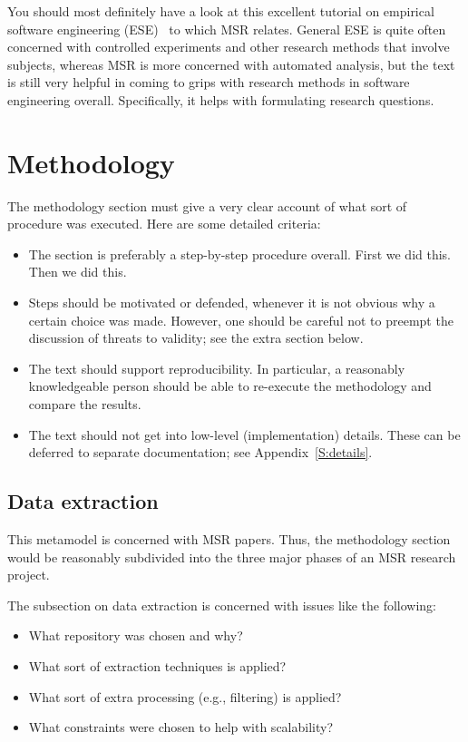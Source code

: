 \documentclass{llncs}
\begin{document}
You should most definitely have a look at this excellent tutorial on
empirical software engineering (ESE)~\cite{Easterbrook07} to which MSR
relates. General ESE is quite often concerned with controlled
experiments and other research methods that involve subjects, whereas
MSR is more concerned with automated analysis, but the text is still
very helpful in coming to grips with research methods in software
engineering overall. Specifically, it helps with formulating research questions.


\section{Methodology}

The methodology section must give a very clear account of what sort of
procedure was executed. Here are some detailed criteria:
%
\begin{itemize}
\item The section is preferably a step-by-step procedure overall. First we did
  this. Then we did this.
\item Steps should be motivated or defended, whenever it is not
  obvious why a certain choice was made. However, one should be
  careful not to preempt the discussion of threats to validity; see
  the extra section below.
\item The text should support reproducibility. In particular, a
  reasonably knowledgeable person should be able to re-execute the
  methodology and compare the results.
\item The text should not get into low-level (implementation)
  details. These can be deferred to separate documentation; see Appendix~\ref{S:details}.
\end{itemize}

\subsection{Data extraction}

This metamodel is concerned with MSR papers. Thus, the methodology
section would be reasonably subdivided into the three major phases of
an MSR research project.

The subsection on data extraction is concerned with issues like the
following:

\begin{itemize}
\item What repository was chosen and why?
\item What sort of extraction techniques is applied?
\item What sort of extra processing (e.g., filtering) is applied?
\item What constraints were chosen to help with scalability?
\end{itemize}
\end{document}
